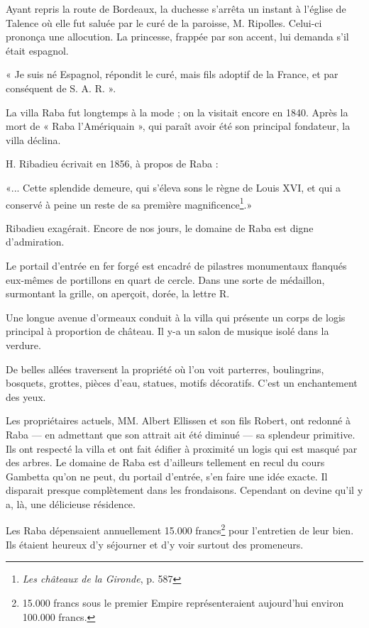 Ayant repris la route de Bordeaux, la duchesse s'arrêta un instant à l'église de Talence où elle fut saluée par le curé de la paroisse, M. Ripolles. Celui-ci prononça une allocution. La princesse, frappée par son accent, lui demanda s'il était espagnol. 

« Je suis né Espagnol, répondit le curé, mais fils adoptif de la France, et par conséquent de S. A. R. ».

La villa Raba fut longtemps à la mode ; on la visitait encore en 1840. Après la mort de « Raba l'Amériquain », qui paraît avoir été son principal fondateur, la villa déclina.

H. Ribadieu écrivait en 1856, à propos de Raba :

«... Cette splendide demeure, qui s'éleva sons le règne de Louis XVI, et qui a conservé à peine un reste de sa première magnificence\footnote{\textit{Les châteaux de la Gironde}, p. 587}.»

Ribadieu exagérait. Encore de nos jours, le domaine de Raba est digne d'admiration.

Le portail d'entrée en fer forgé est encadré de pilastres monumentaux flanqués eux-mêmes de portillons en quart de cercle. Dans une sorte de médaillon, surmontant la grille, on aperçoit, dorée, la lettre R.

Une longue avenue d'ormeaux conduit à la villa qui présente un corps de logis principal à proportion de château. Il y-a un salon de musique isolé dans la verdure.

De belles allées traversent la propriété où l'on voit parterres, boulingrins, bosquets, grottes, pièces d'eau, statues, motifs décoratifs. C'est un enchantement des yeux.

Les propriétaires actuels, MM. Albert Ellissen et son fils Robert, ont redonné à Raba — en admettant que son attrait ait été diminué — sa splendeur primitive. Ils ont respecté la villa et ont fait édifier à proximité un logis qui est masqué par des arbres. Le domaine de Raba est d'ailleurs tellement en recul du cours Gambetta qu'on ne peut, du portail d'entrée, s'en faire une idée exacte. Il disparait presque complètement dans les frondaisons. Cependant on devine qu'il y a, là, une délicieuse résidence.

Les Raba dépensaient annuellement 15.000 francs\footnote{15.000 francs sous le premier Empire représenteraient aujourd'hui environ 100.000 francs.} pour l'entretien de leur bien. Ils étaient heureux d'y séjourner et d'y voir surtout des promeneurs.